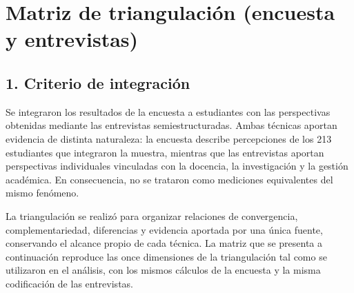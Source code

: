 \chapter{Matriz de triangulación (encuesta y entrevistas)}
\label{apx:triangulacion}

\section*{1. Criterio de integración}
Se integraron los resultados de la encuesta a estudiantes con las perspectivas obtenidas mediante las entrevistas semiestructuradas. Ambas técnicas aportan evidencia de distinta naturaleza: la encuesta describe percepciones de los 213 estudiantes que integraron la muestra, mientras que las entrevistas aportan perspectivas individuales vinculadas con la docencia, la investigación y la gestión académica. En consecuencia, no se trataron como mediciones equivalentes del mismo fenómeno.

La triangulación se realizó para organizar relaciones de convergencia, complementariedad, diferencias y evidencia aportada por una única fuente, conservando el alcance propio de cada técnica. La matriz que se presenta a continuación reproduce las once dimensiones de la triangulación tal como se utilizaron en el análisis, con los mismos cálculos de la encuesta y la misma codificación de las entrevistas.

